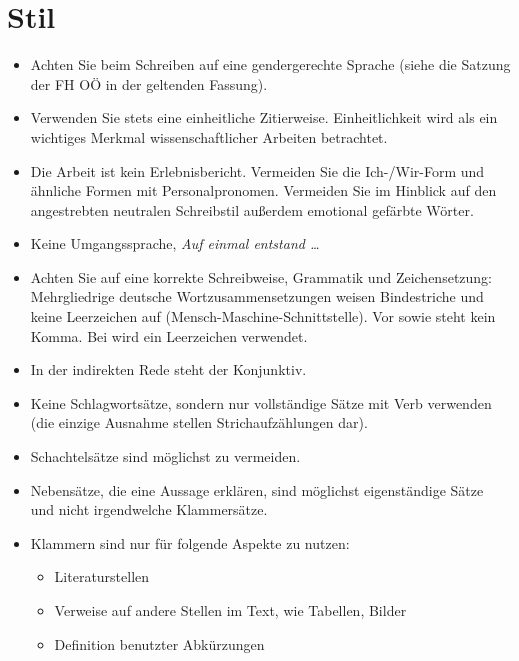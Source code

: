 \section{Stil}
\begin{itemize}
	\item	Achten Sie beim Schreiben auf eine gendergerechte Sprache (siehe die Satzung der FH OÖ in der geltenden Fassung).
	\item	Verwenden Sie stets eine einheitliche Zitierweise. Einheitlichkeit wird als ein wichtiges Merkmal wissenschaftlicher Arbeiten betrachtet.
	\item	Die Arbeit ist kein Erlebnisbericht. Vermeiden Sie die Ich-/Wir-Form und ähnliche Formen mit Personalpronomen. Vermeiden Sie im Hinblick auf den angestrebten neutralen Schreibstil außerdem emotional gefärbte Wörter.
	\item	Keine Umgangssprache, \zB \textit{Auf einmal entstand \dots}
	\item	Achten Sie auf eine korrekte Schreibweise, Grammatik und Zeichensetzung: Mehrgliedrige deutsche Wortzusammensetzungen weisen Bindestriche und keine Leerzeichen auf (\zB Mensch-Maschine-Schnittstelle). Vor \etc sowie \usw steht kein Komma. Bei \zB wird ein Leerzeichen verwendet.
	\item	In der indirekten Rede steht der Konjunktiv.
	\item	Keine Schlagwortsätze, sondern nur vollständige Sätze mit Verb verwenden (die einzige Ausnahme stellen Strichaufzählungen dar).
	\item	Schachtelsätze sind möglichst zu vermeiden.
	\item	Nebensätze, die eine Aussage erklären, sind möglichst eigenständige Sätze und nicht irgendwelche Klammersätze.
	\item	Klammern sind nur für folgende Aspekte zu nutzen:
	\begin{itemize}
		\item	Literaturstellen
		\item	Verweise auf andere Stellen im Text, wie Tabellen, Bilder \etc
		\item	Definition benutzter Abkürzungen
	\end{itemize}
	

\end{itemize}
